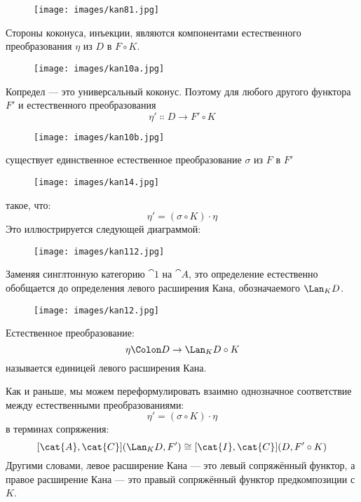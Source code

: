 \begin{figure}[H]
  \centering
  \texttt{[image: images/kan81.jpg]}
\end{figure}

\noindent
Стороны коконуса, инъекции, являются компонентами естественного
преобразования $\eta$ из $D$ в $F \circ K$.

\begin{figure}[H]
  \centering
  \texttt{[image: images/kan10a.jpg]}
\end{figure}

\noindent
Копредел — это универсальный коконус. Поэтому для любого другого функтора
$F'$ и естественного преобразования
\[\eta' \Colon D \to F' \circ K\]

\begin{figure}[H]
  \centering
  \texttt{[image: images/kan10b.jpg]}
\end{figure}

\noindent
существует единственное естественное преобразование $\sigma$ из $F$ в $F'$

\begin{figure}[H]
  \centering
  \texttt{[image: images/kan14.jpg]}
\end{figure}

\noindent
такое, что:
\[\eta' = (\sigma \circ K) \cdot \eta\]
Это иллюстрируется следующей диаграммой:

\begin{figure}[H]
  \centering
  \texttt{[image: images/kan112.jpg]}
\end{figure}

\noindent
Заменяя синглтонную категорию $\cat{1}$ на $\cat{A}$, это
определение естественно обобщается до определения левого расширения Кана,
обозначаемого $\Lan_{K}D$.

\begin{figure}[H]
  \centering
  \texttt{[image: images/kan12.jpg]}
\end{figure}

\noindent
Естественное преобразование:
\[\eta \Colon D \to \Lan_{K}D \circ K\]
называется единицей левого расширения Кана.

Как и раньше, мы можем переформулировать взаимно однозначное соответствие между естественными
преобразованиями:
\[\eta' = (\sigma \circ K) \cdot \eta\]
в терминах сопряжения:
\[[\cat{A}, \cat{C}](\Lan_{K}D, F') \cong [\cat{I}, \cat{C}](D, F' \circ K)\]
Другими словами, левое расширение Кана — это левый сопряжённый функтор, а
правое расширение Кана — это правый сопряжённый функтор предкомпозиции с
$K$.

